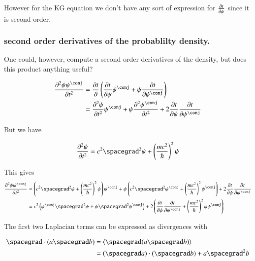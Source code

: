 \documentclass{article}
\newcommand{\PDSq}[2]{\frac{\partial^2 {#2}}{\partial {#1}^2}}
\begin{document}
However for the KG equation we don't have any sort of expression for $\frac{\partial{t}}{\partial {\psi}}$ since it is second order.

\subsubsection{ second order derivatives of the probablilty density. }

One could, however, compute a second order derivatives of the density, but does this product anything useful?

\begin{align*}
\PDSq{t}{\psi\psi^\conj} 
&= \PD{t}{}\left( \PD{t}{\psi}\psi^\conj + \psi \PD{t}{\psi^\conj} \right) \\
&= 
\PDSq{t}{\psi}\psi^\conj 
+ \psi \PDSq{t}{\psi^\conj} 
+ 2 \PD{t}{\psi}\PD{t}{\psi^\conj} 
\\
\end{align*}

But we have 

\begin{align*}
\PDSq{t}{\psi} = c^2 \spacegrad^2 \psi + \left(\frac{m c^2}{\hbar} \right)^2 \psi
\end{align*}

This gives
\begin{align*}
\PDSq{t}{\psi\psi^\conj} 
&= 
\left( c^2 \spacegrad^2 \psi + \left(\frac{m c^2}{\hbar} \right)^2 \psi \right) \psi^\conj 
+ \psi \left( c^2 \spacegrad^2 \psi^\conj + \left(\frac{m c^2}{\hbar} \right)^2 \psi^\conj \right)
+ 2 \PD{t}{\psi}\PD{t}{\psi^\conj} 
\\
&= 
c^2 \left( \psi^\conj \spacegrad^2 \psi + \psi \spacegrad^2 \psi^\conj \right)
+ 2 \left( 
\PD{t}{\psi}\PD{t}{\psi^\conj} + \left( \frac{m c^2}{\hbar} \right)^2 \psi \psi^\conj 
\right)
\\
\end{align*}

The first two Laplacian terms can be expressed as divergences with

\begin{align*}
\spacegrad \cdot (a \spacegrad b) 
&= 
\gpgradezero{ \spacegrad (a \spacegrad b) } \\
&= 
(\spacegrad a) \cdot (\spacegrad b) + a \spacegrad^2 b
\end{align*}
\end{document}
